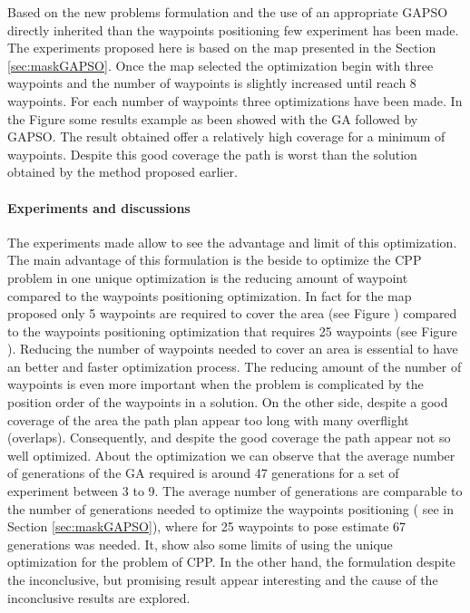 		
	Based on the new problems formulation and the use of an appropriate GAPSO directly inherited than the waypoints positioning few experiment has been made. The experiments proposed here is based on the map presented in the Section \ref{sec:maskGAPSO}.
  Once the map selected the optimization begin with three waypoints and the number of waypoints is slightly increased until reach 8 waypoints. For each number of waypoints  three optimizations have been made. In the Figure  some results example as been showed with the GA followed  by GAPSO. The result obtained offer a relatively high coverage for a minimum of waypoints. Despite this good coverage the path is worst than the solution obtained by the method proposed earlier.  

	\paragraph*{Experiments and discussions}	
The experiments made allow to see the advantage and limit of this optimization. 
The main advantage of this formulation is the beside to optimize the CPP problem in one unique optimization is the reducing amount of waypoint compared to the waypoints positioning optimization. In fact for the map proposed only  5 waypoints are required to cover  the area (see Figure ) compared to the waypoints positioning optimization that requires 25 waypoints (see Figure ). Reducing the number of waypoints needed to cover an area is essential to have an better and faster optimization process. The reducing amount of the number of waypoints is even more important when the problem is complicated by the position order of the waypoints in a solution. 
	On the other side, despite a good coverage of the area the path plan appear too long with many overflight (overlaps). Consequently, and despite the good  coverage the path appear not so well optimized. 
	About the optimization we can observe that the average number of generations of the GA required is around 47 generations for a set of experiment between 3 to 9. The average number of generations  are  comparable to the number of generations needed to optimize the waypoints positioning ( see in Section \ref{sec:maskGAPSO}), where for 25 waypoints to pose estimate 67 generations was needed. 
	It, show also some limits of using the unique optimization for the problem of CPP. In the other hand, the formulation despite the inconclusive, but promising result appear interesting and the cause of the inconclusive results are explored.
	
